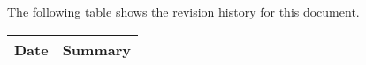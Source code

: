 The following table shows the revision history for this document.

\begin{table}[h]
  \centering
  \begin{tabularx}{\textwidth}{|l|X|}
    \hline
    \rowcolor{iob-green}
             {\bf Date} & {\bf Summary} \\ \hline
     
  \end{tabularx}
\end{table}
